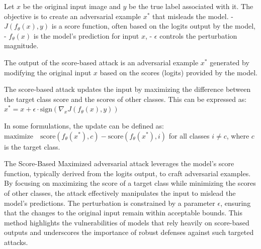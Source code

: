 
Let $x$ be the original input image and $y$ be the true label associated with it. The objective is to create an adversarial example $x^*$ that misleads the model.
- $J(f_\theta(x), y)$ is a score function, often based on the logits output by the model,
- $f_\theta(x)$ is the model's prediction for input $x$,
- $\epsilon$ controls the perturbation magnitude.

The output of the score-based attack is an adversarial example $x^*$ generated by modifying the original input $x$ based on the scores (logits) provided by the model.

The score-based attack updates the input by maximizing the difference between the target class score and the scores of other classes. This can be expressed as:
$x^* = x + \epsilon \cdot \text{sign}(\nabla_x J(f_\theta(x), y))$

In some formulations, the update can be defined as:
$\text{maximize} \quad \text{score}(f_\theta(x^*), c) - \text{score}(f_\theta(x^*), i)$
for all classes $i \neq c$, where $c$ is the target class.

The Score-Based Maximized adversarial attack leverages the model's score function, typically derived from the logits output, to craft adversarial examples. By focusing on maximizing the score of a target class while minimizing the scores of other classes, the attack effectively manipulates the input to mislead the model's predictions. The perturbation is constrained by a parameter $\epsilon$, ensuring that the changes to the original input remain within acceptable bounds. This method highlights the vulnerabilities of models that rely heavily on score-based outputs and underscores the importance of robust defenses against such targeted attacks.